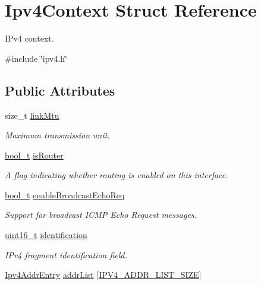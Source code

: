 \hypertarget{structIpv4Context}{}\section{Ipv4\+Context Struct Reference}
\label{structIpv4Context}


I\+Pv4 context.  




{\ttfamily \#include \char`\"{}ipv4.\+h\char`\"{}}

\subsection*{Public Attributes}
\begin{DoxyCompactItemize}
\item 
size\+\_\+t \hyperlink{structIpv4Context_a62d0b87b8c952d8bcf8c989ed40f692c}{link\+Mtu}
\begin{DoxyCompactList}\small\item\em Maximum transmission unit. \end{DoxyCompactList}\item 
\hyperlink{compiler__port_8h_a812d16e5494522586b3784e55d479912}{bool\+\_\+t} \hyperlink{structIpv4Context_ae9031c47162e51b5dcd1c64168c561bf}{is\+Router}
\begin{DoxyCompactList}\small\item\em A flag indicating whether routing is enabled on this interface. \end{DoxyCompactList}\item 
\hyperlink{compiler__port_8h_a812d16e5494522586b3784e55d479912}{bool\+\_\+t} \hyperlink{structIpv4Context_a4ed415170798301eb11150f65f10b9d4}{enable\+Broadcast\+Echo\+Req}
\begin{DoxyCompactList}\small\item\em Support for broadcast I\+C\+MP Echo Request messages. \end{DoxyCompactList}\item 
\hyperlink{stdint_8h_a273cf69d639a59973b6019625df33e30}{uint16\+\_\+t} \hyperlink{structIpv4Context_a55a5fdb5eaa7d8700f0fa462e54c605c}{identification}
\begin{DoxyCompactList}\small\item\em I\+Pv4 fragment identification field. \end{DoxyCompactList}\item 
\hyperlink{structIpv4AddrEntry}{Ipv4\+Addr\+Entry} \hyperlink{structIpv4Context_afa460f63677873896a3d223597316dbd}{addr\+List} \mbox{[}\hyperlink{ipv4_8h_a360065ed2949f3d5f9f7e6ac4e9ad7e1}{I\+P\+V4\+\_\+\+A\+D\+D\+R\+\_\+\+L\+I\+S\+T\+\_\+\+S\+I\+ZE}\mbox{]}

\end{DoxyCompactItemize}
